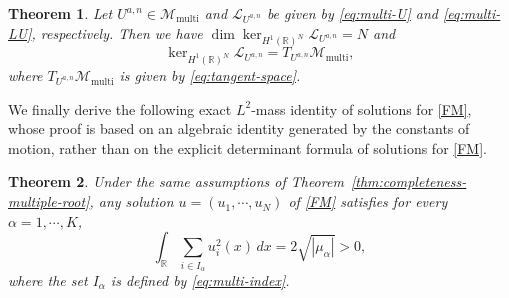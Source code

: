 \documentclass[11pt]{article}
\numberwithin{equation}{section}
\newtheorem{theorem}{Theorem}[section]
\theoremstyle{definition}
\begin{document}
\begin{theorem}
\label{prop:nondegeneracy-multiple-roots}
Let $U^{a,n}\in\mathcal M_{\mathrm{multi}}$ and $\mathcal L_{U^{a,n}}$ be given by
\eqref{eq:multi-U} and
\eqref{eq:multi-LU}, respectively.
Then we have
$\dim\ker_{H^1(\mathbb R)^N}\mathcal L_{U^{a,n}}=N$ and
\[
\ker_{H^1(\mathbb R)^N}\mathcal L_{U^{a,n}}
=
T_{U^{a,n}}\mathcal M_{\mathrm{multi}},
\]
where $T_{U^{a,n}}\mathcal M_{\mathrm{multi}}$ is given by \eqref{eq:tangent-space}.
\end{theorem}


%
We finally derive the following exact $L^2$-mass identity of   solutions for \eqref{FM}, whose proof is based on an algebraic identity generated by the constants of motion, rather than on the explicit determinant formula of solutions for \eqref{FM}.


\begin{theorem}\label{thm L2iden}
Under the same assumptions of
Theorem~\ref{thm:completeness-multiple-root}, any solution $u=(u_1, \cdots, u_N)$ of \eqref{FM} satisfies for every
\(\alpha=1,\cdots,K\),
\begin{equation}\label{L2ident}
	\int_{\mathbb R}\sum_{i\in I_\alpha}u_i^2(x)\,dx
	=
	2\sqrt{|\mu_\alpha|}>0,
\end{equation}
where the set $I_\alpha$ is defined by \eqref{eq:multi-index}.
\end{theorem}
\end{document}
